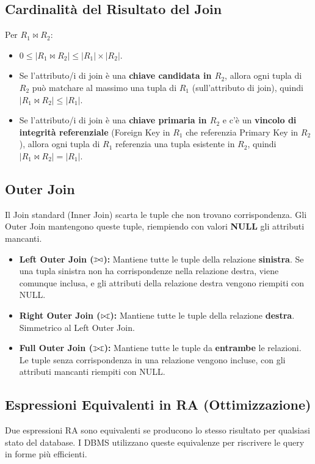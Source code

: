 \documentclass{article}
\newcommand{\naturaljoin}{\Join}
\def\ojoin{\setbox0=\hbox{$\bowtie$}%
	\rule[-.02ex]{.25em}{.4pt}\llap{\rule[\ht0]{.25em}{.4pt}}}
\def\leftouterjoin{\mathbin{\ojoin\mkern-5.8mu\bowtie}}
\def\rightouterjoin{\mathbin{\bowtie\mkern-5.8mu\ojoin}}
\def\fullouterjoin{\mathbin{\ojoin\mkern-5.8mu\bowtie\mkern-5.8mu\ojoin}}
\begin{document}
	\subsection{Cardinalità del Risultato del Join}
	Per $R_1 \naturaljoin R_2$:
	\begin{itemize}
		\item $0 \leq |R_1 \naturaljoin R_2| \leq |R_1| \times |R_2|$.
		\item Se l'attributo/i di join è una \textbf{chiave candidata in $R_2$}, allora ogni tupla di $R_2$ può matchare al massimo una tupla di $R_1$ (sull'attributo di join), quindi $|R_1 \naturaljoin R_2| \leq |R_1|$.
		\item Se l'attributo/i di join è una \textbf{chiave primaria in $R_2$} e c'è un \textbf{vincolo di integrità referenziale} (Foreign Key in $R_1$ che referenzia Primary Key in $R_2$), allora ogni tupla di $R_1$ referenzia una tupla esistente in $R_2$, quindi $|R_1 \naturaljoin R_2| = |R_1|$.
	\end{itemize}
	
	\subsection{Outer Join}
	Il Join standard (Inner Join) scarta le tuple che non trovano corrispondenza. Gli Outer Join mantengono queste tuple, riempiendo con valori \textbf{NULL} gli attributi mancanti.
	\begin{itemize}
		\item \textbf{Left Outer Join ($\leftouterjoin$):} Mantiene tutte le tuple della relazione \textbf{sinistra}. Se una tupla sinistra non ha corrispondenze nella relazione destra, viene comunque inclusa, e gli attributi della relazione destra vengono riempiti con NULL.
		\item \textbf{Right Outer Join ($\rightouterjoin$):} Mantiene tutte le tuple della relazione \textbf{destra}. Simmetrico al Left Outer Join.
		\item \textbf{Full Outer Join ($\fullouterjoin$):} Mantiene tutte le tuple da \textbf{entrambe} le relazioni. Le tuple senza corrispondenza in una relazione vengono incluse, con gli attributi mancanti riempiti con NULL.
	\end{itemize}
	
	\subsection{Espressioni Equivalenti in RA (Ottimizzazione)}
	Due espressioni RA sono equivalenti se producono lo stesso risultato per qualsiasi stato del database. I DBMS utilizzano queste equivalenze per riscrivere le query in forme più efficienti.
	
\end{document}
